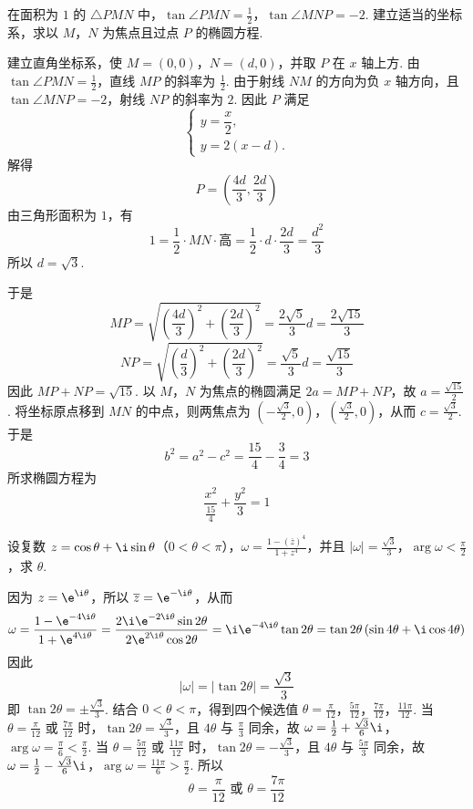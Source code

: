 \documentclass[UTF8,a4paper,oneside,11pt]{ctexbook}
\begin{document}
\begin{problem}
在面积为 \(1\) 的 \(\triangle PMN\) 中，\(\tan \angle PMN=\frac{1}{2}\)，\(\tan \angle MNP=-2\). 建立适当的坐标系，求以 \(M\)，\(N\) 为焦点且过点 \(P\) 的椭圆方程.
\end{problem}

\begin{solution}
建立直角坐标系，使 \(M=(0,0)\)，\(N=(d,0)\)，并取 \(P\) 在 \(x\) 轴上方. 由 \(\tan\angle PMN=\frac12\)，直线 \(MP\) 的斜率为 \(\frac12\). 由于射线 \(NM\) 的方向为负 \(x\) 轴方向，且 \(\tan\angle MNP=-2\)，射线 \(NP\) 的斜率为 \(2\). 因此 \(P\) 满足
\[
\begin{cases}
y=\dfrac{x}{2},\\
y=2(x-d).
\end{cases}
\]
解得
\[
P=\left(\frac{4d}{3},\frac{2d}{3}\right)
\]
由三角形面积为 \(1\)，有
\[
1=\frac12\cdot MN\cdot\text{高}=\frac12\cdot d\cdot\frac{2d}{3}=\frac{d^2}{3}
\]
所以 \(d=\sqrt3\).

于是
\[
MP=\sqrt{\left(\frac{4d}{3}\right)^2+\left(\frac{2d}{3}\right)^2}=\frac{2\sqrt5}{3}d=\frac{2\sqrt{15}}{3}
\]
\[
NP=\sqrt{\left(\frac{d}{3}\right)^2+\left(\frac{2d}{3}\right)^2}=\frac{\sqrt5}{3}d=\frac{\sqrt{15}}{3}
\]
因此 \(MP+NP=\sqrt{15}\). 以 \(M\)，\(N\) 为焦点的椭圆满足 \(2a=MP+NP\)，故 \(a=\frac{\sqrt{15}}{2}\). 将坐标原点移到 \(MN\) 的中点，则两焦点为 \(\left(-\frac{\sqrt3}{2},0\right)\)，\(\left(\frac{\sqrt3}{2},0\right)\)，从而 \(c=\frac{\sqrt3}{2}\). 于是
\[
b^2=a^2-c^2=\frac{15}{4}-\frac{3}{4}=3
\]
所求椭圆方程为
\[
\boxed{\frac{x^2}{\frac{15}{4}}+\frac{y^2}{3}=1}
\]
\end{solution}

\begin{problem}
设复数 \(z=\cos\theta+\i\sin\theta\)（\(0<\theta<\pi\)），\(\omega=\frac{1-\left(\overline{z}\right)^4}{1+z^4}\)，并且 \(|\omega|=\frac{\sqrt{3}}{3}\)，\(\arg \omega<\frac{\pi}{2}\)，求 \(\theta\).
\end{problem}

\begin{solution}
因为 \(z=\e^{\i\theta}\)，所以 \(\overline z=\e^{-\i\theta}\)，从而
\[
\omega=\frac{1-\e^{-4\i\theta}}{1+\e^{4\i\theta}}
=\frac{2\i\e^{-2\i\theta}\sin2\theta}{2\e^{2\i\theta}\cos2\theta}
=\i\e^{-4\i\theta}\tan2\theta
=\tan2\theta\left(\sin4\theta+\i\cos4\theta\right)
\]
因此
\[
|\omega|=|\tan2\theta|=\frac{\sqrt3}{3}
\]
即 \(\tan2\theta=\pm\frac{\sqrt3}{3}\). 结合 \(0<\theta<\pi\)，得到四个候选值
\(\theta=\frac{\pi}{12}\)，\(\frac{5\pi}{12}\)，\(\frac{7\pi}{12}\)，\(\frac{11\pi}{12}\).
当 \(\theta=\frac{\pi}{12}\) 或 \(\frac{7\pi}{12}\) 时，\(\tan2\theta=\frac{\sqrt3}{3}\)，且 \(4\theta\) 与 \(\frac{\pi}{3}\) 同余，故
\(\omega=\frac12+\frac{\sqrt3}{6}\i\)，\(\arg\omega=\frac{\pi}{6}<\frac{\pi}{2}\).
当 \(\theta=\frac{5\pi}{12}\) 或 \(\frac{11\pi}{12}\) 时，\(\tan2\theta=-\frac{\sqrt3}{3}\)，且 \(4\theta\) 与 \(\frac{5\pi}{3}\) 同余，故
\(\omega=\frac12-\frac{\sqrt3}{6}\i\)，\(\arg\omega=\frac{11\pi}{6}>\frac{\pi}{2}\).
所以
\[
\boxed{\theta=\frac{\pi}{12}\text{ 或 }\theta=\frac{7\pi}{12}}
\]
\end{solution}

\end{document}
